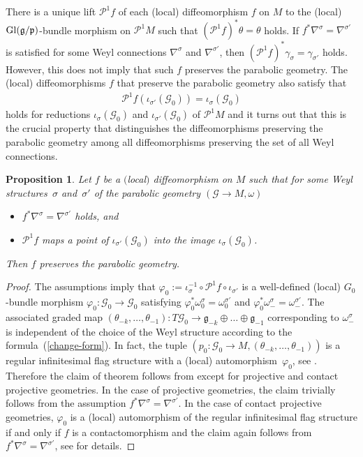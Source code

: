\documentclass[pdftex]{sigma}
\newcommand{\om}{\omega}
\newcommand{\si}{\sigma}
\newcommand{\ba}{\mathcal{G}}
\newcommand{\va}{\varphi}
\newcommand{\fg}{\mathfrak g}
\newcommand{\fp}{\mathfrak p}
\numberwithin{equation}{section}
\newtheorem{Proposition}[Theorem]{Proposition}
 { \theoremstyle{definition}
\newtheorem{Definition}[Theorem]{Definition}
\newtheorem{Example}[Theorem]{Example}
\newtheorem{Remark}[Theorem]{Remark} }
\begin{document}
There is a unique lift $\mathcal{P}^1f$ of each (local) dif\/feomorphism $f$ on $M$ to the (local) ${\rm Gl}(\fg/\fp)$-bundle morphism on $\mathcal{P}^1M$ such that $(\mathcal{P}^1f)^*\theta=\theta$ holds. If $f^*\nabla^{\si}=\nabla^{\si'}$ is satisf\/ied for some Weyl connections $\nabla^{\si}$ and $\nabla^{\si'}$, then $(\mathcal{P}^1f)^*\gamma_\si=\gamma_{\si'}$ holds. However, this does not imply that such $f$ preserves the parabolic geometry. The (local) dif\/feomorphisms $f$ that preserve the parabolic geometry also satisfy that
\begin{gather*}\mathcal{P}^1f(\iota_{\si'}(\ba_0))=\iota_\si(\ba_0)\end{gather*} holds for reductions $\iota_\si(\ba_0)$ and $\iota_{\si'}(\ba_0)$ of $\mathcal{P}^1M$ and it turns out that this is the crucial property that distinguishes the dif\/feo\-mor\-phisms preserving the parabolic geometry among all dif\/feo\-mor\-phisms preserving the set of all Weyl connections.

\begin{Proposition} \label{auto}
Let $f$ be a $($local$)$ diffeomorphism on $M$ such that for some Weyl structu\-res~$\si$ and~$\si'$ of the parabolic geometry $(\ba\to M,\om)$
\begin{itemize}\itemsep=0pt
\item $f^*\nabla^{\si}=\nabla^{\si'}$ holds, and
\item $\mathcal{P}^1f$ maps a point of $\iota_{\si'}(\ba_0)$ into the image $\iota_{\si}(\ba_0)$.
\end{itemize}
Then $f$ preserves the parabolic geometry.
\end{Proposition}
\begin{proof}
The assumptions imply that $\va_0:= \iota_{\si}^{-1}\circ \mathcal{P}^1f\circ \iota_{\si'}$ is a well-def\/ined (local) $G_0$-bundle morphism $\va_0\colon \ba_0\to \ba_0$ satisfying $\va_0^*\om_{0}^\si=\om_{0}^{\si'}$ and $\va_0^*\om_-^\si=\om_-^{\si'}$. The associated graded map $(\theta_{-k},\dots,\theta_{-1})\colon T\ba_0\to \fg_{-k}\oplus \dots \oplus \fg_{-1}$ corresponding to $\om_-^\si$ is independent of the choice of the Weyl structure according to the formula~(\ref{change-form}). In fact, the tuple $(p_0\colon \ba_0\to M, (\theta_{-k},\dots,\theta_{-1}))$ is a regular inf\/initesimal f\/lag structure with a (local) automorphism~$\va_0$, see \cite[Section~3.1.6--3.1.8]{parabook}. Therefore the claim of theorem follows from \cite[Theorem~3.1.14]{parabook} except for projective and contact projective geometries. In the case of projective geometries, the claim trivially follows from the assumption $f^*\nabla^{\si}=\nabla^{\si'}$. In the case of contact projective geometries, $\va_0$ is a (local) automorphism of the regular inf\/initesimal f\/lag structure if and only if $f$ is a contactomorphism and the claim again follows from $f^*\nabla^{\si}=\nabla^{\si'}$, see \cite[Section 4.2]{parabook} for details.
\end{proof}
\end{document}
